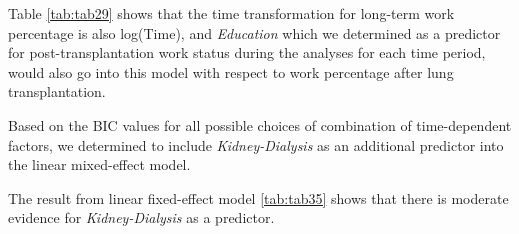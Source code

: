 \documentclass[11pt, a4paper]{article}\usepackage[]{graphicx}\usepackage[]{color}
\begin{document}
{Table \ref{tab:tab29} shows that the time transformation for long-term work percentage is also log(Time), and \textit{Education} which we determined as a predictor for post-transplantation work status during the analyses for each time period, would also go into this model with respect to work percentage after lung transplantation.
\begin{table}[ht]
\centering
\caption{Model selection for work percentage based on Time-dependent factors} 
\end{table}


Based on the BIC values for all possible choices of combination of time-dependent factors, we determined to include \textit{Kidney-Dialysis} as an additional predictor into the linear mixed-effect model. 


The result from linear fixed-effect model \ref{tab:tab35} shows that there is moderate evidence for \textit{Kidney-Dialysis} as a predictor. 

\begin{table}[ht]
\centering
\caption{Result for Linear Mixed-effects 
                 Model for Post-LTx Work percentages} 
\label{tab:tab35}
\end{table}



}
\end{document}
